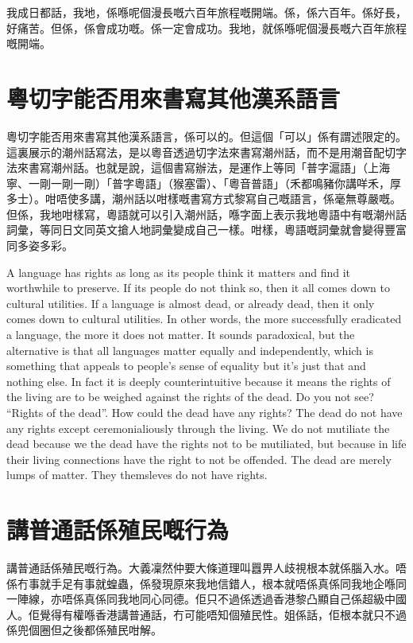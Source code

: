 \documentclass[a5paper, 10pt, openany]{book} %
\begin{document}
我成日都話，我地，係喺呢個漫長嘅六百年旅程嘅開端。係，係六百年。係好長，好痛苦。但係，係會成功嘅。係一定會成功。我地，就係喺呢個漫長嘅六百年旅程嘅開端。


\chapter{粵切字能否用來書寫其他漢系語言}
粵切字能否用來書寫其他漢系語言，係可以的。但這個「可以」係有謂述限定的。這裏展示的潮州話寫法，是以粵音透過切字法來書寫潮州話，而不是用潮音配切字法來書寫潮州話。也就是說，這個書寫辦法，是運作上等同「普字滬語」（上海寧、一剛一剛一剛）「普字粵語」（猴塞雷）、「粵音普語」（禾都鳴豬你講咩禾，厚多士）。咁唔使多講，潮州話以咁樣嘅書寫方式黎寫自己嘅語言，係毫無尊嚴嘅。但係，我地咁樣寫，粵語就可以引入潮州話，喺字面上表示我地粵語中有嘅潮州話詞彙，等同日文同英文搶人地詞彙變成自己一樣。咁樣，粵語嘅詞彙就會變得豐富同多姿多彩。


A language has rights as long as its people think it matters and find it worthwhile to preserve. If its people do not think so, then it all comes down to cultural utilities. If a language is almost dead, or already dead, then it only comes down to cultural utilities. In other words, the more successfully eradicated a language, the more it does not matter. It sounds paradoxical, but the alternative is that all languages matter equally and independently, which is something that appeals to people’s sense of equality but it’s just that and nothing else. In fact it is deeply counterintuitive because it means the rights of the living are to be weighed against the rights of the dead. Do you not see? “Rights of the dead”. How could the dead have any rights? The dead do not have any rights except ceremonialiously through the living. We do not mutiliate the dead because we the dead have the rights not to be mutiliated, but because in life their living connections have the right to not be offended. The dead are merely lumps of matter. They themsleves do not have rights.

\chapter{講普通話係殖民嘅行為}
講普通話係殖民嘅行為。大義凜然仲要大條道理叫囂畀人歧視根本就係腦入水。唔係冇事就手足有事就蝗蟲，係發現原來我地信錯人，根本就唔係真係同我地企喺同一陣線，亦唔係真係同我地同心同德。佢只不過係透過香港黎凸顯自己係超級中國人。佢覺得有權喺香港講普通話，冇可能唔知個殖民性。姐係話，佢根本就只不過係兜個圈但之後都係殖民咁解。
\end{document}
